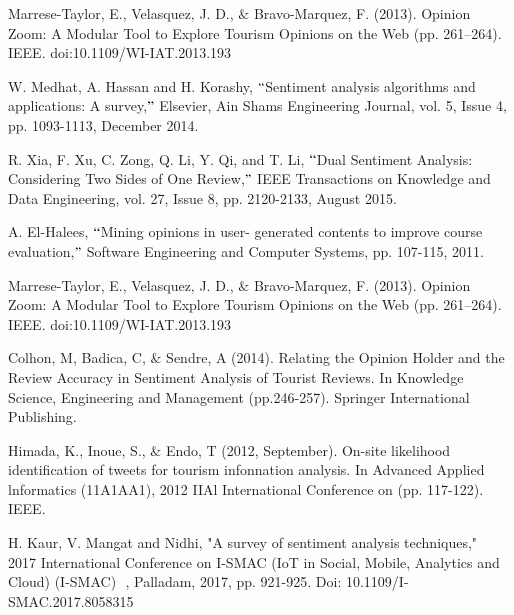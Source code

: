 \documentclass[12pt]{article}
\begin{document}
\vspace{\baselineskip}
\setlength{\parskip}{9.96pt}
\newpage
\begin{thebibliography}{99}

\vspace{\baselineskip}
Marrese-Taylor, E., Velasquez, J. D., $\&$  Bravo-Marquez, F. (2013). Opinion Zoom: A Modular Tool to Explore Tourism Opinions on the Web (pp. 261–264). IEEE. doi:10.1109/WI-IAT.2013.193\par

 W. Medhat, A. Hassan and H. Korashy, $``$Sentiment analysis algorithms and applications: A survey,$"$  Elsevier, Ain Shams Engineering Journal, vol. 5, Issue 4, pp. 1093-1113, December 2014.\par

R. Xia, F. Xu, C. Zong, Q. Li, Y. Qi, and T. Li, $``$Dual Sentiment Analysis: Considering Two Sides of One Review,$"$  IEEE Transactions on Knowledge and Data Engineering, vol. 27, Issue 8, pp. 2120-2133, August 2015.\par

A. El-Halees, $``$Mining opinions in user- generated contents to improve course evaluation,$"$  Software Engineering and Computer Systems, pp. 107-115, 2011.\par

Marrese-Taylor, E., Velasquez, J. D., $\&$  Bravo-Marquez, F. (2013). Opinion Zoom: A Modular Tool to Explore Tourism Opinions on the Web (pp. 261–264). IEEE. doi:10.1109/WI-IAT.2013.193\par

\setlength{\parskip}{12.0pt}
Colhon, M, Badica, C, $\&$  Sendre, A (2014). Relating the Opinion Holder and the Review Accuracy in Sentiment Analysis of Tourist Reviews. In Knowledge Science, Engineering and Management (pp.246-257). Springer International Publishing.\par

Himada, K., Inoue, S., $\&$  Endo, T (2012, September). On-site likelihood identification of tweets for tourism infonnation analysis. In Advanced Applied lnformatics (11A1AA1), 2012 IIAl International Conference on (pp. 117-122). IEEE.\par

H. Kaur, V. Mangat and Nidhi, "A survey of sentiment analysis techniques," ​ 2017 International Conference on I-SMAC (IoT in Social, Mobile, Analytics and Cloud) (I-SMAC) ​ , Palladam, 2017, pp. 921-925. Doi: 10.1109/I-SMAC.2017.8058315\par


\end{thebibliography}
\end{document}
